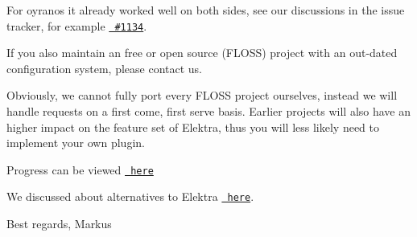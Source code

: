 For oyranos it already worked well on both sides, see our discussions in the issue tracker, for example \href{https://issues.libelektra.org/1134}{\texttt{ \#1134}}.

If you also maintain an free or open source (F\+L\+O\+SS) project with an out-\/dated configuration system, please contact us.

Obviously, we cannot fully port every F\+L\+O\+SS project ourselves, instead we will handle requests on a first come, first serve basis. Earlier projects will also have an higher impact on the feature set of Elektra, thus you will less likely need to implement your own plugin.


\begin{DoxyItemize}
\item Progress can be viewed \href{https://git.libelektra.org/projects/7}{\texttt{ here}}
\item We discussed about alternatives to Elektra \href{https://issues.libelektra.org/1266}{\texttt{ here}}.
\end{DoxyItemize}

Best regards, Markus 